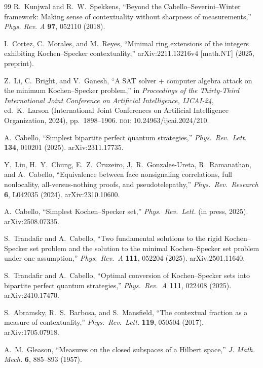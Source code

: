 \documentclass[12pt,a4paper]{article}
\begin{document}
\begin{thebibliography}{99}
R.~Kunjwal and R.~W.~Spekkens,
``Beyond the Cabello--Severini--Winter framework: Making sense of contextuality without sharpness of measurements,''
\textit{Phys. Rev. A} \textbf{97}, 052110 (2018).

I.~Cortez, C.~Morales, and M.~Reyes,
``Minimal ring extensions of the integers exhibiting Kochen--Specker contextuality,''
arXiv:2211.13216v4 [math.NT] (2025, preprint).

Z.~Li, C.~Bright, and V.~Ganesh,
``A {SAT} solver + computer algebra attack on the minimum {Kochen}--{Specker} problem,''
in \textit{Proceedings of the Thirty-Third International Joint Conference on Artificial Intelligence, {IJCAI-24}},
ed.\ K.~Larson (International Joint Conferences on Artificial Intelligence Organization, 2024),
pp.~1898--1906.
\textsc{doi}: 10.24963/ijcai.2024/210.

A.~Cabello,
``Simplest bipartite perfect quantum strategies,''
\textit{Phys.\ Rev.\ Lett.} \textbf{134}, 010201 (2025).
arXiv:2311.17735.

Y.~Liu, H.~Y.~Chung, E.~Z.~Cruzeiro, J.~R.~Gonzales-Ureta, R.~Ramanathan, and A.~Cabello,
``Equivalence between face nonsignaling correlations, full nonlocality, all-versus-nothing proofs, and pseudotelepathy,''
\textit{Phys.\ Rev.\ Research} \textbf{6}, L042035 (2024).
arXiv:2310.10600.

A.~Cabello,
``Simplest Kochen--Specker set,''
\textit{Phys.\ Rev.\ Lett.} (in press, 2025).
arXiv:2508.07335.

S.~Trandafir and A.~Cabello,
``Two fundamental solutions to the rigid Kochen--Specker set problem and the solution to the minimal Kochen--Specker set problem under one assumption,''
\textit{Phys.\ Rev.\ A} \textbf{111}, 052204 (2025).
arXiv:2501.11640.

S.~Trandafir and A.~Cabello,
``Optimal conversion of Kochen--Specker sets into bipartite perfect quantum strategies,''
\textit{Phys.\ Rev.\ A} \textbf{111}, 022408 (2025).
arXiv:2410.17470.

S.~Abramsky, R.~S.~Barbosa, and S.~Mansfield,
``The contextual fraction as a measure of contextuality,''
\textit{Phys.\ Rev.\ Lett.} \textbf{119}, 050504 (2017).
arXiv:1705.07918.

A.~M.~Gleason,
``Measures on the closed subspaces of a Hilbert space,''
\textit{J. Math. Mech.} \textbf{6}, 885--893 (1957).


\end{thebibliography}
\end{document}
